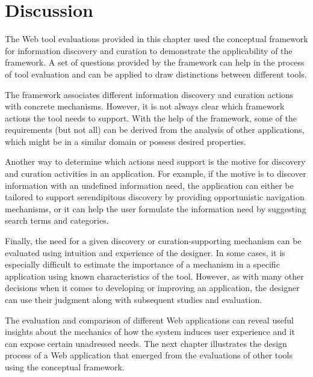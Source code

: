 {\section{Discussion}
The Web tool evaluations provided in this chapter used the conceptual framework for information discovery and curation to demonstrate the applicability of the framework. A set of questions provided by the framework can help in the process of tool evaluation and can be applied to draw distinctions between different tools. 

The framework associates different information discovery and curation actions with concrete mechanisms. However, it is not always clear which framework actions the tool needs to support. With the help of the framework, some of the requirements (but not all) can be derived from the analysis of other applications, which might be in a similar domain or possess desired properties. 

Another way to determine which actions need support is the motive for discovery and curation activities in an application. For example, if the motive is to discover information with an undefined information need, the application  can either be tailored to support serendipitous discovery by providing opportunistic navigation mechanisms, or it can help the user formulate the information need by suggesting search terms and categories.

Finally, the need for a given discovery or curation-supporting mechanism can be evaluated using intuition and experience of the designer. In some cases, it is especially difficult to estimate the importance of a mechanism in a specific application using known characteristics of the tool. However, as with many other decisions when it comes to developing or improving an application, the designer can use their judgment along with subsequent studies and evaluation. 

The evaluation and comparison of different Web applications can reveal useful insights about the mechanics of how the system induces user experience and it can expose certain unadressed needs. The next chapter illustrates the design process of a Web application that emerged from the evaluations of other tools using the conceptual framework. 

} %